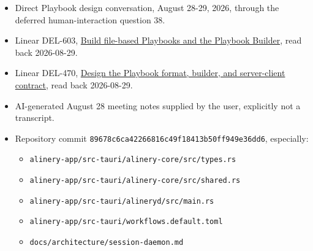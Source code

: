 \documentclass[11pt]{article}
\newcommand{\baselinehash}{\texttt{89678c6ca4226681\allowbreak6c49f18413b50ff9\allowbreak49e36dd6}}
\begin{document}
\begin{itemize}
  \item Direct Playbook design conversation, August 28-29, 2026, through the deferred human-interaction question 38.
  \item Linear DEL-603, \href{https://linear.app/delegance/issue/DEL-603/build-file-based-playbooks-and-the-playbook-builder}{Build file-based Playbooks and the Playbook Builder}, read back 2026-08-29.
  \item Linear DEL-470, \href{https://linear.app/delegance/issue/DEL-470/design-the-playbook-format-builder-and-server-client-contract}{Design the Playbook format, builder, and server-client contract}, read back 2026-08-29.
  \item AI-generated August 28 meeting notes supplied by the user, explicitly not a transcript.
  \item Repository commit \baselinehash, especially:
    \begin{itemize}
      \item \texttt{alinery-app/src-tauri/alinery-core/src/types.rs}
      \item \texttt{alinery-app/src-tauri/alinery-core/src/shared.rs}
      \item \texttt{alinery-app/src-tauri/alineryd/src/main.rs}
      \item \texttt{alinery-app/src-tauri/workflows.default.toml}
      \item \texttt{docs/architecture/session-daemon.md}
    \end{itemize}
\end{itemize}
\end{document}

